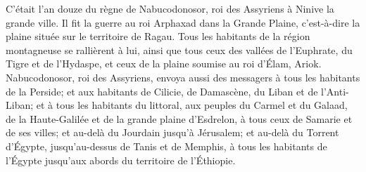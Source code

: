 C’était l’an douze du règne de Nabucodonosor, roi des Assyriens à Ninive la grande ville.
Il fit la guerre au roi Arphaxad dans la Grande Plaine,
	c’est-à-dire la plaine située sur le territoire de Ragau.
Tous les habitants de la région montagneuse se rallièrent à lui,
	ainsi que tous ceux des vallées de l’Euphrate, du Tigre et de l’Hydaspe,
	et ceux de la plaine soumise au roi d’Élam, Ariok.
Nabucodonosor, roi des Assyriens,
	envoya aussi des messagers à tous les habitants de la Perside;
	et aux habitants de Cilicie, de Damascène, du Liban et de l’Anti-Liban;
	et à tous les habitants du littoral, aux peuples du Carmel et du Galaad,
	de la Haute-Galilée et de la grande plaine d’Esdrelon,
	à tous ceux de Samarie et de ses villes;
	et au-delà du Jourdain jusqu’à Jérusalem;
	et au-delà du Torrent d’Égypte, jusqu’au-dessus de Tanis et de Memphis,
	à tous les habitants de l’Égypte jusqu’aux abords du territoire de l’Éthiopie.
